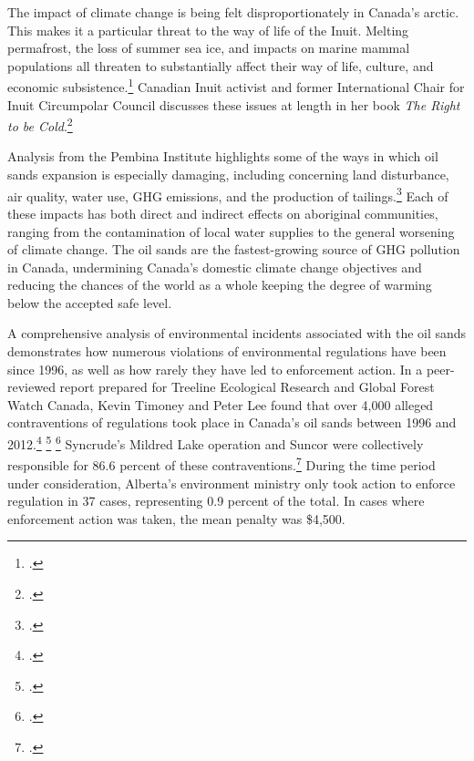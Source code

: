\documentclass[10pt]{article}
\begin{document}
The impact of climate change is being felt disproportionately in Canada's arctic.
This makes it a particular threat to the way of life of the Inuit.
Melting permafrost, the loss of summer sea ice, and impacts on marine mammal populations all threaten to substantially affect their way of life, culture, and economic subsistence.\footcite[See: ][]{Ahmed2013}
Canadian Inuit activist and former International Chair for Inuit Circumpolar Council discusses these issues at length in her book \emph{The Right to be Cold}.\footcite[][]{RightToBeCold}



Analysis from the Pembina Institute highlights some of the ways in which oil sands expansion is especially damaging, including concerning land disturbance, air quality, water use, GHG emissions, and the production of tailings.\footcite[][p. 1]{PembinaOilsandsExpansion}
Each of these impacts has both direct and indirect effects on aboriginal communities, ranging from the contamination of local water supplies to the general worsening of climate change.
The oil sands are the fastest-growing source of GHG pollution in Canada, undermining Canada's domestic climate change objectives and reducing the chances of the world as a whole keeping the degree of warming below the accepted safe level.



A comprehensive analysis of environmental incidents associated with the oil sands demonstrates how numerous violations of environmental regulations have been since 1996, as well as how rarely they have led to enforcement action.
In a peer-reviewed report prepared for Treeline Ecological Research and Global Forest Watch Canada, Kevin Timoney and Peter Lee found that over 4,000 alleged contraventions of regulations took place in Canada's oil sands between 1996 and 2012.\footcite[][p. 8]{OnePercentReport} \footcite[See also: ][]{GlobalFewerOnePercent} \footcite[See also: ][]{FinPoOnePercent}
Syncrude's Mildred Lake operation and Suncor were collectively responsible for 86.6 percent of these contraventions.\footcite[][p. 8]{OnePercentReport}
During the time period under consideration, Alberta's environment ministry only took action to enforce regulation in 37 cases, representing 0.9 percent of the total.
In cases where enforcement action was taken, the mean penalty was \$4,500.
\end{document}
